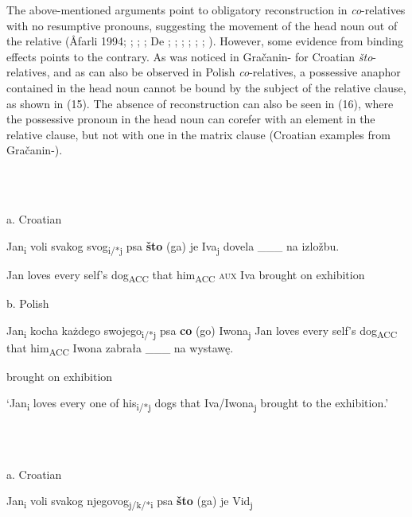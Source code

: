 \documentclass[output=paper]{langsci/langscibook}
\begin{document}
The above-mentioned arguments point to obligatory reconstruction in \textit{co}{}-relatives with no resumptive pronouns, suggesting the movement of the head noun out of the relative (Åfarli 1994; \citealt{Bhatt2002}; \citealt{Bianchi1999}; \citealt{Brame1968}; De \citealt{Vries2002}; \citealt{Hornstein2000}; \citealt{Kayne1994}; \citealt{Safir1999}; \citealt{Schachter1973}; \citealt{Vergnaud1974}; \citealt{Zwart2000}). However, some evidence from binding effects points to the contrary. As was noticed in Gračanin-\citet{Yuksek2013} for Croatian \textit{što}{}-relatives, and as can also be observed in Polish \textit{co}{}-relatives, a possessive anaphor contained in the head noun cannot be bound by the subject of the relative clause, as shown in (15). The absence of reconstruction can also be seen in (16), where the possessive pronoun in the head noun can corefer with an element in the relative clause, but not with one in the matrix clause (Croatian examples from Gračanin-\citealt{Yuksek2013}).

\ea%
    \label{ex:key:15}
    \gll\\
        \\
    \glt
    \z

          a.  Croatian

Jan\textsubscript{i} voli   svakog   svog\textsubscript{i/*j} psa   \textbf{što} (ga)   je   Iva\textsubscript{j} dovela \_\_\_ na izložbu.

\textsubscript{} Jan   loves   every   self’s   dog\textsubscript{ACC}  that  him\textsubscript{ACC}  \textsc{aux}  Iva   brought on exhibition 

  b.   Polish

Jan\textsubscript{i} kocha   każdego   swojego\textsubscript{i/*j} psa   \textbf{co}   (go)   Iwona\textsubscript{j}         Jan   loves   every   self’s   dog\textsubscript{ACC}   that  him\textsubscript{ACC}  Iwona         zabrała \_\_\_   na wystawę.     

  brought   on exhibition    

    ‘Jan\textsubscript{i} loves every one of his\textsubscript{i/*j} dogs that Iva/Iwona\textsubscript{j} brought to the exhibition.’

\ea%
    \label{ex:key:16}
    \gll\\
        \\
    \glt
    \z

          a.   Croatian

Jan\textsubscript{i}  voli   svakog   njegovog\textsubscript{j/k/*i} psa   \textbf{što} (ga)   je   Vid\textsubscript{j}
\end{document}
